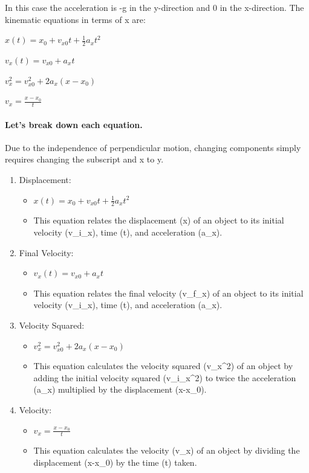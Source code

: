 \documentclass[11pt]{article}
\providecommand{\tightlist}{%
      \setlength{\itemsep}{0pt}\setlength{\parskip}{0pt}}
\begin{document}
In this case the acceleration is -g in the y-direction and 0 in the
x-direction. The kinematic equations in terms of x are:

\(x(t) = x_0 + v_{x0}t + \frac{1}{2}a_xt^2\)

\(v_x(t) = v_{x0} + a_xt\)

\(v_x^2 = v_{x0}^2 + 2a_x(x-x_0)\)

\(v_x = \frac{x-x_0}{t}\)

    \hypertarget{lets-break-down-each-equation.}{%
\paragraph{\texorpdfstring{\textbf{Let's break down each
equation.}}{Let's break down each equation.}}\label{lets-break-down-each-equation.}}

Due to the independence of perpendicular motion, changing components
simply requires changing the subscript and x to y.

\begin{enumerate}
\def\labelenumi{\arabic{enumi}.}
\tightlist
\item
  Displacement:

  \begin{itemize}
  \tightlist
  \item
    \(x(t) = x_0 + v_{x0}t + \frac{1}{2}a_xt^2\)
  \item
    This equation relates the displacement (x) of an object to its
    initial velocity (v\_i\_x), time (t), and acceleration (a\_x).
  \end{itemize}
\item
  Final Velocity:

  \begin{itemize}
  \tightlist
  \item
    \(v_x(t) = v_{x0} + a_xt\)
  \item
    This equation relates the final velocity (v\_f\_x) of an object to
    its initial velocity (v\_i\_x), time (t), and acceleration (a\_x).
  \end{itemize}
\item
  Velocity Squared:

  \begin{itemize}
  \tightlist
  \item
    \(v_x^2 = v_{x0}^2 + 2a_x(x-x_0)\)
  \item
    This equation calculates the velocity squared (v\_x\^{}2) of an
    object by adding the initial velocity squared (v\_i\_x\^{}2) to
    twice the acceleration (a\_x) multiplied by the displacement
    (x-x\_0).
  \end{itemize}
\item
  Velocity:

  \begin{itemize}
  \tightlist
  \item
    \(v_x = \frac{x-x_0}{t}\)
  \item
    This equation calculates the velocity (v\_x) of an object by
    dividing the displacement (x-x\_0) by the time (t) taken.
  \end{itemize}
\end{enumerate}
\end{document}
